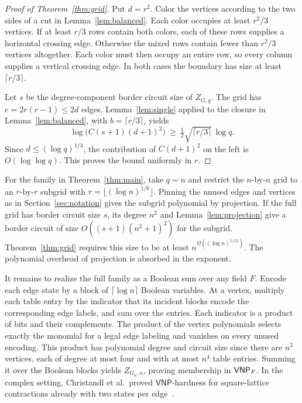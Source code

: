 \begin{proof}[Proof of Theorem~\ref{thm:grid}]
Put $d=r^2$. Color the vertices according to the two sides of a cut in
Lemma~\ref{lem:balanced}. Each color occupies at least $r^2/3$
vertices. If at least $r/3$ rows contain both colors, each of these
rows supplies a horizontal crossing edge. Otherwise the mixed rows
contain fewer than $r^2/3$ vertices altogether. Each color must then
occupy an entire row, so every column supplies a vertical crossing
edge. In both cases the boundary has size at least $\lceil r/3\rceil$.

Let $s$ be the degree-component border circuit size of $Z_{G,q}$.
The grid has $e=2r(r-1)\le 2d$ edges. Lemma~\ref{lem:single} applied
to the closure in Lemma~\ref{lem:balanced}, with
$b=\lceil r/3\rceil$, yields
\[
 \log\!\bigl(C(s+1)(d+1)^2\bigr)
        \ \ge\ \tfrac12\sqrt{\lceil r/3\rceil}\,\log q.
\]
Since $d\le(\log q)^{1/3}$, the contribution of $C(d+1)^2$ on the
left is $O(\log\log q)$. This proves the bound uniformly in $r$.
\end{proof}

For the family in Theorem~\ref{thm:main}, take $q=n$ and restrict the
$n$-by-$n$ grid to an $r$-by-$r$ subgrid with
$r=\lfloor(\log n)^{1/6}\rfloor$. Pinning the unused edges and vertices
as in Section~\ref{sec:notation} gives the subgrid polynomial by
projection. If the full grid has border circuit size $s$, its degree
$n^2$ and Lemma~\ref{lem:projection} give a border circuit of size
$O((s+1)(n^2+1)^2)$ for the subgrid. Theorem~\ref{thm:grid} requires
this size to be at least $n^{\Omega((\log n)^{1/12})}$. The polynomial
overhead of projection is absorbed in the exponent.

It remains to realize the full family as a Boolean sum over any field
$F$. Encode each edge state by a block of $\lceil\log n\rceil$ Boolean
variables. At a vertex, multiply each table entry by the indicator
that its incident blocks encode the corresponding edge labels, and
sum over the entries. Each indicator is a product of bits and their
complements. The product of the vertex polynomials selects exactly
the monomial for a legal edge labeling and vanishes on every unused
encoding. This product has polynomial degree and circuit size since
there are $n^2$ vertices, each of degree at most four and with at most
$n^4$ table entries. Summing it over the Boolean blocks yields
$Z_{G_n,n}$, proving membership in $\mathsf{VNP}_F$. In the complex setting,
Christandl et al.\ proved $\mathsf{VNP}$-hardness for square-lattice
contractions already with two states per edge~\cite[Theorem~26]{CLSW}.
